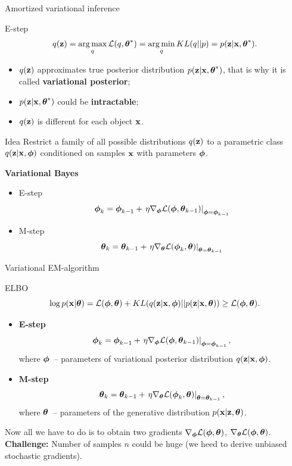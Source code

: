	\begin{frame}{Amortized variational inference}
		\begin{block}{E-step}
			\vspace{-0.3cm}
			\[
			q(\mathbf{z}) = \operatorname*{arg\,max}_q \mathcal{L} (q, \boldsymbol{\theta}^*) = \operatorname*{arg\,min}_q KL(q || p) =
			p(\mathbf{z}| \mathbf{x}, \boldsymbol{\theta}^*).
			\]
			\vspace{-0.3cm}
			\begin{itemize}
				\item $q(\mathbf{z})$ approximates true posterior distribution $p(\mathbf{z}| \mathbf{x}, \boldsymbol{\theta}^*)$, that is why it is called \textbf{variational posterior};
				\item $p(\mathbf{z}| \mathbf{x}, \boldsymbol{\theta}^*)$ could be \textbf{intractable};
				\item $q(\mathbf{z})$ is different for each object $\mathbf{x}$.
			\end{itemize}
			\vspace{-0.3cm}
		\end{block}
		\begin{block}{Idea}
			Restrict a family of all possible distributions $q(\mathbf{z})$ to a parametric class $q(\mathbf{z}|\mathbf{x}, \boldsymbol{\phi})$ conditioned on samples $\mathbf{x}$ with parameters $\boldsymbol{\phi}$.
		\end{block}
		
		\textbf{Variational Bayes}
		\begin{itemize}
			\item E-step
			\[
			\boldsymbol{\phi}_k = \boldsymbol{\phi}_{k-1} + \left.\eta \nabla_{\boldsymbol{\phi}} \mathcal{L}(\boldsymbol{\phi}, \boldsymbol{\theta}_{k-1})\right|_{\boldsymbol{\phi}=\boldsymbol{\phi}_{k-1}}
			\]
			\item M-step
			\[
			\boldsymbol{\theta}_k = \boldsymbol{\theta}_{k-1} + \left.\eta \nabla_{\boldsymbol{\theta}} \mathcal{L}(\boldsymbol{\phi}_k, \boldsymbol{\theta})\right|_{\boldsymbol{\theta}=\boldsymbol{\theta}_{k-1}}
			\]
		\end{itemize}
	\end{frame}
	\begin{frame}{Variational EM-algorithm}
		\begin{block}{ELBO}
			\vspace{-0.5cm}
			\[
			\log p(\mathbf{x}| \boldsymbol{\theta}) = \mathcal{L} (\boldsymbol{\phi}, \boldsymbol{\theta}) + KL(q(\mathbf{z} | \mathbf{x}, \boldsymbol{\phi}) || p(\mathbf{z}|\mathbf{x}, \boldsymbol{\theta})) \geq \mathcal{L} (\boldsymbol{\phi}, \boldsymbol{\theta}).
			\]
			\vspace{-0.5cm}
		\end{block}
		\begin{itemize}
			\item \textbf{E-step}
			\[
			\boldsymbol{\phi}_k = \boldsymbol{\phi}_{k-1} + \left.\eta \nabla_{\boldsymbol{\phi}} \mathcal{L}(\boldsymbol{\phi}, \boldsymbol{\theta}_{k-1})\right|_{\boldsymbol{\phi}=\boldsymbol{\phi}_{k-1}},
			\]
			where $\boldsymbol{\phi}$~-- parameters of variational posterior distribution $q(\mathbf{z} | \mathbf{x}, \boldsymbol{\phi})$.
			\item \textbf{M-step}
			\[
			\boldsymbol{\theta}_k = \boldsymbol{\theta}_{k-1} + \left.\eta \nabla_{\boldsymbol{\theta}} \mathcal{L}(\boldsymbol{\phi}_k, \boldsymbol{\theta})\right|_{\boldsymbol{\theta}=\boldsymbol{\theta}_{k-1}},
			\]
			where $\boldsymbol{\theta}$~-- parameters of the generative distribution $p(\mathbf{x} | \mathbf{z}, \boldsymbol{\theta})$.
		\end{itemize}
		Now all we have to do is to obtain two gradients $\nabla_{\boldsymbol{\phi}} \mathcal{L}(\boldsymbol{\phi}, \boldsymbol{\theta})$, $\nabla_{\boldsymbol{\theta}} \mathcal{L}(\boldsymbol{\phi}, \boldsymbol{\theta})$.  \\
		\textbf{Challenge:} Number of samples $n$ could be huge (we heed to derive unbiased stochastic gradients).
	\end{frame}
